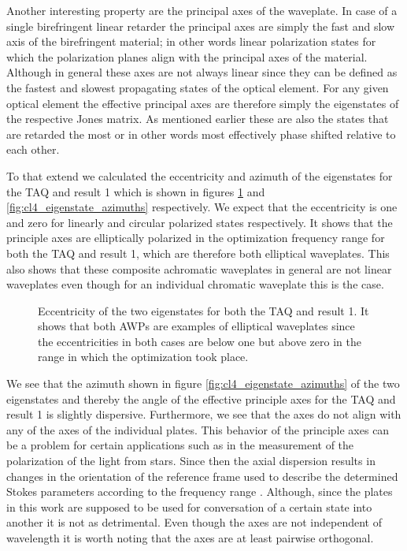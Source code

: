 Another interesting property are the principal axes of the waveplate. In case of a single birefringent linear retarder the principal axes are simply the fast and slow axis of the birefringent material; in other words linear polarization states for which the polarization planes align with the principal axes of the material. Although in general these axes are not always linear since they can be defined as the fastest and slowest propagating states of the optical element. For any given optical element the effective principal axes are therefore simply the eigenstates of the respective Jones matrix. As mentioned earlier these are also the states that are retarded the most or in other words most effectively phase shifted relative to each other. 

To that extend we calculated the eccentricity and azimuth of the eigenstates for the TAQ and result 1 which is shown in figures \ref{fig:cl4_eigenstate_eccentricity} and \ref{fig:cl4_eigenstate_azimuths} respectively. We expect that the eccentricity is one and zero for linearly and circular polarized states respectively. It shows that the principle axes are elliptically polarized in the optimization frequency range for both the TAQ and result 1, which are therefore both elliptical waveplates. This also shows that these composite achromatic waveplates in general are not linear waveplates even though for an individual chromatic waveplate this is the case.

\begin{figure}[H]
    \centering
    
    \caption{Eccentricity of the two eigenstates for both the TAQ and result 1. It shows that both AWPs are examples of elliptical waveplates since the eccentricities in both cases are below one but above zero in the range in which the optimization took place.}
    \label{fig:cl4_eigenstate_eccentricity}
\end{figure}

We see that the azimuth shown in figure \ref{fig:cl4_eigenstate_azimuths} of the two eigenstates and thereby the angle of the effective principle axes for the TAQ and result 1 is slightly dispersive. Furthermore, we see that the axes do not align with any of the axes of the individual plates. This behavior of the principle axes can be a problem for certain applications such as in the measurement of the polarization of the light from stars. Since then the axial dispersion results in changes in the orientation of the reference frame used to describe the determined Stokes parameters according to the frequency range \cite{Clarke2004, Bailey2019}. Although, since the plates in this work are supposed to be used for conversation of a certain state into another it is not as detrimental. Even though the axes are not independent of wavelength it is worth noting that the axes are at least pairwise orthogonal.

